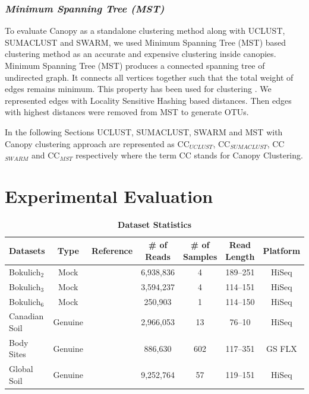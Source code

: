 \documentclass[10pt, conference, compsocconf]{IEEEtran}
\begin{document}
\subsubsection{\textit{Minimum Spanning Tree (MST)}}
To evaluate Canopy as a standalone clustering method along with UCLUST, SUMACLUST and SWARM, we used Minimum Spanning Tree (MST) based clustering method as an accurate and expensive clustering inside canopies. Minimum Spanning Tree (MST) produces a connected spanning tree of undirected graph. It connects all vertices together such that the total weight of edges remains minimum. This property has been used for clustering \cite{MARMstCluster}\cite{MARMstClustering2}\cite{MARMstClustering3}. We represented edges with Locality Sensitive Hashing based distances. Then edges with highest distances were removed from MST to generate OTUs.

In the following Sections UCLUST, SUMACLUST, SWARM and MST with Canopy clustering approach are represented as CC$_{UCLUST}$, CC$_{SUMACLUST}$, CC$_{SWARM}$ and CC$_{MST}$ respectively where the term CC stands for Canopy Clustering. 

\section{Experimental Evaluation}
\begin{table}[tb] 
\centering 
\caption{\textbf{Dataset Statistics}} \label{table:finaltabledataset} 
\begin{tabular}{|l| c c c c c c|} 
\hline
\multicolumn{1}{|c|}{{\bf{Datasets}}} & \multicolumn{1}{c}{{\bf{Type}}} & {\bf{Reference}} & {\bf{\# of Reads}} & {\bf{\# of Samples}} & {\bf{Read Length}} & {\bf{Platform}}\\
\hline
{Bokulich$_2$} & Mock & \cite{MARmockDatasetRef} & 6,938,836 & 4 & 189--251 & HiSeq\\
{Bokulich$_3$} & Mock & \cite{MARmockDatasetRef} & 3,594,237 & 4 & 114--151 & HiSeq\\
{Bokulich$_6$} & Mock & \cite{MARmockDatasetRef} & 250,903 & 1 & 114--150 & HiSeq\\
{Canadian Soil} & Genuine & \cite{MARcanadianSoil} & 2,966,053 & 13 & 76--10 & HiSeq\\
{Body Sites} & Genuine & \cite{MARbodySites} & 886,630 & 602 & 117--351 & GS FLX\\
{Global Soil} & Genuine & \cite{MARglobalSoil} & 9,252,764 & 57 & 119--151 & HiSeq\\
\hline
\end{tabular}
\end{table} 
\end{document}

